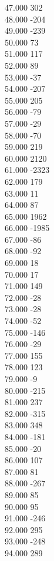 { 47.000	302 \\
 48.000	-204 \\
 49.000	-239 \\
 50.000	73 \\
 51.000	117 \\
 52.000	89 \\
 53.000	-37 \\
 54.000	-207 \\
 55.000	205 \\
 56.000	-79 \\
 57.000	-29 \\
 58.000	-70 \\
 59.000	219 \\
 60.000	2120 \\
 61.000	-2323 \\
 62.000	179 \\
 63.000	11 \\
 64.000	87 \\
 65.000	1962 \\
 66.000	-1985 \\
 67.000	-86 \\
 68.000	-92 \\
 69.000	18 \\
 70.000	17 \\
 71.000	149 \\
 72.000	-28 \\
 73.000	-28 \\
 74.000	-52 \\
 75.000	-146 \\
 76.000	-29 \\
 77.000	155 \\
 78.000	123 \\
 79.000	-9 \\
 80.000	-215 \\
 81.000	237 \\
 82.000	-315 \\
 83.000	348 \\
 84.000	-181 \\
 85.000	-20 \\
 86.000	107 \\
 87.000	81 \\
 88.000	-267 \\
 89.000	85 \\
 90.000	95 \\
 91.000	-246 \\
 92.000	295 \\
 93.000	-248 \\
 94.000	289 \\
}
